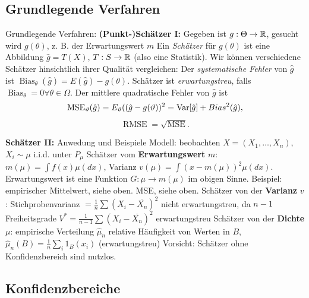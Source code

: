 \subsection{Grundlegende Verfahren}

\begin{outline}
    \1 Grundlegende Verfahren: 
        \2 \textbf{(Punkt-)Schätzer I:} Gegeben ist $g: \Theta \rightarrow \mathbb{R}$, gesucht wird $g(\theta)$, z. B. der Erwartungswert $m$
            \3 Ein \emph{Schätzer} für $g(\theta)$ ist eine Abbildung $\hat{g}=T(X)$, $T:S\rightarrow \mathbb{R}$ (also eine Statistik).
        \2 Wir können verschiedene Schätzer hinsichtlich ihrer Qualität vergleichen:
            \3 Der \emph{systematische Fehler} von $\hat{g}$ ist $\operatorname{Bias}_\theta(\hat{g})=E(\hat{g})-g(\theta)$. Schätzer ist \emph{erwartungstreu}, falls $\operatorname{Bias}_\theta = 0 \forall \theta \in \Omega$.
            \3 Der mittlere quadratische Fehler von $\hat{g}$ ist 
            $$\operatorname{MSE}_\vartheta (\hat{g})=E_\vartheta ((\hat{g}-g(\vartheta))^2=\operatorname{Var}\hspace{-2pt}\left[{\hat{g}}\right]+Bias^2(\hat{g}),$$
            $$\operatorname{RMSE} = \sqrt{\operatorname{MSE}}.$$
\end{outline}

\begin{outline}
    \1 \textbf{Schätzer II:} Anwedung und Beispiele
        \2 Modell: beobachten $X=(X_1,\ldots, X_n)$, $X_i\sim \mu$ i.i.d. unter $P_\mu$
        \2 Schätzer vom \textbf{Erwartungswert} $m$: $m(\mu)=\int f(x) \mu(dx)$, Varianz $v(\mu)=\int (x-m(\mu))^2 \mu(dx)$. 
            \3 Erwartungswert ist eine Funktion $G:\mu \rightarrow m(\mu)$ im obigen Sinne. 
            \3 Beispiel: empirischer Mittelwert, siehe oben. MSE, siehe oben.
        \2 Schätzer von der \textbf{Varianz} $v$: Stichprobenvarianz $= \frac{1}{n}\sum (X_i - \overline{X_n})^2$ 
            \3 nicht erwartungstreu, da $n-1$ Freiheitsgrade 
            \3 $V^* = \frac{1}{n-1}\sum (X_i - \overline{X_n})^2$ erwartungstreu
        \2 Schätzer von der \textbf{Dichte} $\mu$: empirische Verteilung $\hat{\mu}_n$
            \3 relative Häufigkeit von Werten in $B$, $\hat{\mu}_n(B)=\frac{1}{n}\sum_i 1_B(x_i)$ (erwartungstreu)
    \1 Vorsicht: Schätzer ohne Konfidenzbereich sind nutzlos.
\end{outline}

\subsection{Konfidenzbereiche}

